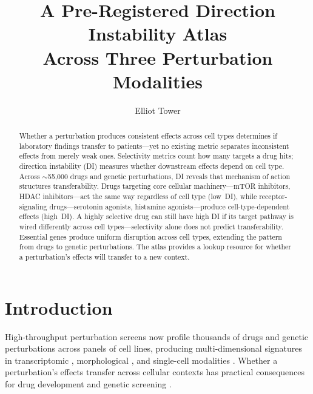 \documentclass[11pt]{article}
\title{A Pre-Registered Direction Instability Atlas\\
Across Three Perturbation Modalities}
\author{Elliot Tower}
\affil{Independent researcher \\ \texttt{elliot@elliottower.ai}}
\date{}
\begin{document}
\maketitle

\begin{abstract}
Whether a perturbation produces consistent effects across cell
types determines if laboratory findings transfer to patients---yet no
existing metric separates inconsistent effects from merely weak ones.
Selectivity metrics count how many targets a drug hits; direction
instability (DI) measures whether downstream effects depend on cell
type.  Across ${\sim}$55{,}000 drugs and genetic perturbations, DI
reveals that mechanism of action structures transferability.  Drugs
targeting core cellular machinery---mTOR inhibitors, HDAC
inhibitors---act the same way regardless of cell type (low~DI), while
receptor-signaling drugs---serotonin agonists, histamine
agonists---produce cell-type-dependent effects (high~DI).  A highly
selective drug can still have high DI if its target pathway is wired
differently across cell types---selectivity alone does not predict
transferability.  Essential genes produce uniform disruption across cell types,
extending the pattern from drugs to genetic perturbations.  The atlas provides
a lookup resource for whether a perturbation's effects will transfer to
a new context.
\end{abstract}


\section{Introduction}

High-throughput perturbation screens now profile thousands of drugs and
genetic perturbations across panels of cell lines, producing
multi-dimensional signatures in transcriptomic
\citep{lamb2006connectivity, subramanian2017next}, morphological
\citep{bray2016cell}, and single-cell modalities \citep{tahoe2025}.
Whether a perturbation's effects transfer across cellular contexts has
practical consequences for drug development and genetic screening
\citep{mcfarland2020context, tower2026confound}.
\end{document}
